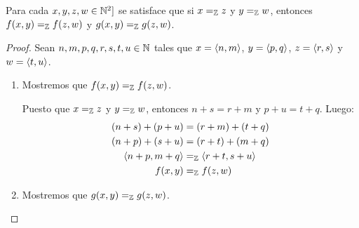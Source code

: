 \begin{lemma}
	\label{lemma: independencia_representantes_z}
	Para cada $x, y, z, w\in\NN^{2}]$ se satisface que si $x =_{\ZZ} z$ y $y =_{\ZZ} w$, entonces $f\pa*{x, y} =_{\ZZ} f\pa*{z, w}$ y $g\pa*{x, y} =_{\ZZ} g\pa*{z, w}$.
\end{lemma}

\begin{proof}
	Sean $n, m, p, q, r, s, t, u\in\NN$ tales que $x =\inner*{n, m}$, $y =\inner*{p, q}$, $z =\inner*{r, s}$ y $w =\inner*{t, u}$.

	\begin{enumerate}
		\item Mostremos que $f\pa*{x, y} =_{\ZZ} f\pa*{z, w}$.

		Puesto que $x =_{\ZZ} z$ y $y =_{\ZZ} w$, entonces $n + s = r + m$ y $p + u = t + q$. Luego:
		\begin{align*}
			\pa*{n + s} +\pa*{p + u} &=\pa*{r + m} +\pa*{t + q}\\
			\pa*{n + p} +\pa*{s + u} &=\pa*{r + t} +\pa*{m + q}\\
			\inner*{n + p, m + q} &=_{\ZZ}\inner*{r + t, s + u}\\
			f\pa*{x, y} &=_{\ZZ} f\pa*{z, w}
		\end{align*}

		\item Mostremos que $g\pa*{x, y} =_{\ZZ} g\pa*{z, w}$.


\end{enumerate}
\end{proof}
